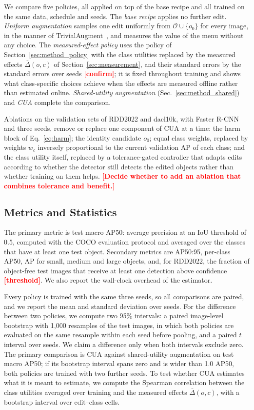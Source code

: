 \documentclass[conference]{IEEEtran}
\newcommand{\todo}[1]{\textcolor{red}{\textbf{[#1]}}}
\begin{document}
We compare five policies, all applied on top of the base recipe and all trained on the same data, schedule and seeds. The \emph{base recipe} applies no further edit. \emph{Uniform augmentation} samples one edit uniformly from $\mathcal{O}\cup\{o_0\}$ for every image, in the manner of TrivialAugment~\cite{muller2021trivial}, and measures the value of the menu without any choice. The \emph{measured-effect policy} uses the policy of Section~\ref{sec:method_policy} with the class utilities replaced by the measured effects $\bar\Delta(o,c)$ of Section~\ref{sec:measurement}, and their standard errors by the standard errors over seeds \todo{confirm}; it is fixed throughout training and shows what class-specific choices achieve when the effects are measured offline rather than estimated online. \emph{Shared-utility augmentation} (Sec.~\ref{sec:method_shared}) and \emph{CUA} complete the comparison.

Ablations on the validation sets of RDD2022 and dacl10k, with Faster R-CNN and three seeds, remove or replace one component of CUA at a time: the harm block of Eq.~\eqref{eq:harm}; the identity candidate $o_0$; equal class weights, replaced by weights $w_c$ inversely proportional to the current validation AP of each class; and the class utility itself, replaced by a tolerance-gated controller that adapts edits according to whether the detector still detects the edited objects rather than whether training on them helps. \todo{Decide whether to add an ablation that combines tolerance and benefit.}

\subsection{Metrics and Statistics}
\label{sec:setup_metrics}

The primary metric is test macro AP50: average precision at an IoU threshold of 0.5, computed with the COCO evaluation protocol and averaged over the classes that have at least one test object. Secondary metrics are AP50:95, per-class AP50, AP for small, medium and large objects, and, for RDD2022, the fraction of object-free test images that receive at least one detection above confidence \todo{threshold}. We also report the wall-clock overhead of the estimator.

Every policy is trained with the same three seeds, so all comparisons are paired, and we report the mean and standard deviation over seeds. For the difference between two policies, we compute two 95\% intervals: a paired image-level bootstrap with 1,000 resamples of the test images, in which both policies are evaluated on the same resample within each seed before pooling, and a paired $t$ interval over seeds. We claim a difference only when both intervals exclude zero. The primary comparison is CUA against shared-utility augmentation on test macro AP50; if its bootstrap interval spans zero and is wider than 1.0 AP50, both policies are trained with two further seeds. To test whether CUA estimates what it is meant to estimate, we compute the Spearman correlation between the class utilities averaged over training and the measured effects $\bar\Delta(o,c)$, with a bootstrap interval over edit--class cells.
\end{document}
